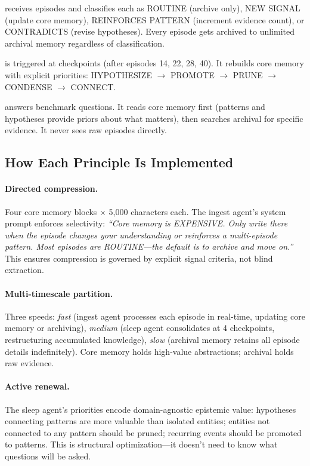 \documentclass[11pt,letterpaper]{article}
\begin{document}
\begin{description}[nosep, leftmargin=1.5em]
  \item[Ingest agent] receives episodes and classifies each as ROUTINE (archive only), NEW SIGNAL (update core memory), REINFORCES PATTERN (increment evidence count), or CONTRADICTS (revise hypotheses). Every episode gets archived to unlimited archival memory regardless of classification.
  \item[Sleep agent] is triggered at checkpoints (after episodes 14, 22, 28, 40). It rebuilds core memory with explicit priorities: HYPOTHESIZE $\to$ PROMOTE $\to$ PRUNE $\to$ CONDENSE $\to$ CONNECT.
  \item[Q\&A agent] answers benchmark questions. It reads core memory first (patterns and hypotheses provide priors about what matters), then searches archival for specific evidence. It never sees raw episodes directly.
\end{description}

\subsection{How Each Principle Is Implemented}

\paragraph{Directed compression.} Four core memory blocks $\times$ 5,000 characters each. The ingest agent's system prompt enforces selectivity: \emph{``Core memory is EXPENSIVE. Only write there when the episode changes your understanding or reinforces a multi-episode pattern. Most episodes are ROUTINE---the default is to archive and move on.''} This ensures compression is governed by explicit signal criteria, not blind extraction.

\paragraph{Multi-timescale partition.} Three speeds: \emph{fast} (ingest agent processes each episode in real-time, updating core memory or archiving), \emph{medium} (sleep agent consolidates at 4 checkpoints, restructuring accumulated knowledge), \emph{slow} (archival memory retains all episode details indefinitely). Core memory holds high-value abstractions; archival holds raw evidence.

\paragraph{Active renewal.} The sleep agent's priorities encode domain-agnostic epistemic value: hypotheses connecting patterns are more valuable than isolated entities; entities not connected to any pattern should be pruned; recurring events should be promoted to patterns. This is structural optimization---it doesn't need to know what questions will be asked.
\end{document}
